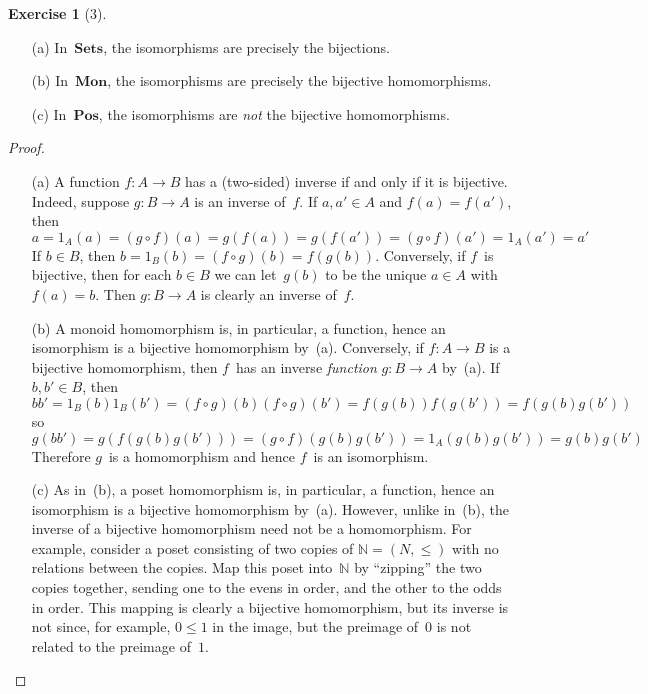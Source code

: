 \documentclass[letterpaper,12pt]{article}
\newcommand{\N}{\mathbb{N}}
\newcommand{\Sets}{\mathbf{Sets}}
\newcommand{\Mon}{\mathbf{Mon}}
\newcommand{\Pos}{\mathbf{Pos}}
\theoremstyle{definition}
\newtheorem*{exer}{Exercise}
\theoremstyle{remark}
\theoremstyle{direction}
\begin{document}
\begin{exer}[3]\
\begin{enumerate}[itemsep=0pt]
\item[(a)] In~\(\Sets\), the isomorphisms are precisely the bijections.
\item[(b)] In~\(\Mon\), the isomorphisms are precisely the bijective homomorphisms.
\item[(c)] In~\(\Pos\), the isomorphisms are \emph{not} the bijective homomorphisms.
\end{enumerate}
\begin{proof}\
\begin{enumerate}
\item[(a)] A function \(f:A\to B\) has a (two-sided) inverse if and only if it is bijective. Indeed, suppose \(g:B\to A\) is an inverse of~\(f\). If \(a,a'\in A\) and \(f(a)=f(a')\), then
\[a=1_A(a)=(g\circ f)(a)=g(f(a))=g(f(a'))=(g\circ f)(a')=1_A(a')=a'\]
If \(b\in B\), then \(b=1_B(b)=(f\circ g)(b)=f(g(b))\). Conversely, if \(f\)~is bijective, then for each \(b\in B\) we can let~\(g(b)\) to be the unique \(a\in A\) with \(f(a)=b\). Then \(g:B\to A\) is clearly an inverse of~\(f\).
\item[(b)] A monoid homomorphism is, in particular, a function, hence an isomorphism is a bijective homomorphism by~(a). Conversely, if \(f:A\to B\) is a bijective homomorphism, then \(f\)~has an inverse \emph{function} \(g:B\to A\) by~(a). If \(b,b'\in B\), then
\[bb'=1_B(b)1_B(b')=(f\circ g)(b)(f\circ g)(b')=f(g(b))f(g(b'))=f(g(b)g(b'))\]
so
\[g(bb')=g(f(g(b)g(b')))=(g\circ f)(g(b)g(b'))=1_A(g(b)g(b'))=g(b)g(b')\]
Therefore \(g\)~is a homomorphism and hence \(f\)~is an isomorphism.
\item[(c)] As in~(b), a poset homomorphism is, in particular, a function, hence an isomorphism is a bijective homomorphism by~(a). However, unlike in~(b), the inverse of a bijective homomorphism need not be a homomorphism. For example, consider a poset consisting of two copies of \(\N=(N,\le)\) with no relations between the copies. Map this poset into~\(\N\) by ``zipping'' the two copies together, sending one to the evens in order, and the other to the odds in order. This mapping is clearly a bijective homomorphism, but its inverse is not since, for example, \(0\le 1\) in the image, but the preimage of~\(0\) is not related to the preimage of~\(1\).\qedhere
\end{enumerate}
\end{proof}
\end{exer}
\end{document}
